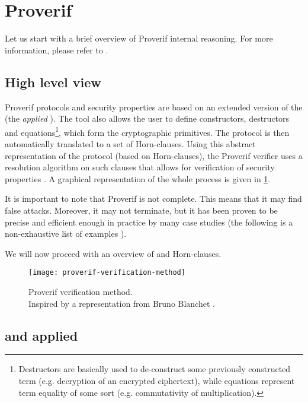 \section{Proverif}
Let us start with a brief overview of Proverif internal reasoning. For more information, please refer to \cite{SymbolicComputationalBlanchet, SymbolicVerificationBlanchet, ProverifManual}.

\subsection{High level view}
Proverif protocols and security properties are based on an extended version of the \pic (the \textit{applied} \pic). The tool also allows the user to define constructors, destructors and equations\footnote{Destructors are basically used to de-construct some previously constructed term (e.g. decryption of an encrypted ciphertext), while equations represent term equality of some sort (e.g. commutativity of multiplication).}, which form the cryptographic primitives. The protocol is then automatically translated to a set of Horn-clauses. Using this abstract representation of the protocol (based on Horn-clauses), the Proverif verifier uses a resolution algorithm on such clauses that allows for verification of security properties \cite{SymbolicComputationalBlanchet}.
A graphical representation of the whole process is given in \cref{fig:proverif-verification-method}.

It is important to note that Proverif is not complete. This means that it may find false attacks. Moreover, it may not terminate, but it has been proven to be precise and efficient enough in practice by many case studies (the following is a non-exhaustive list of examples \cite{10.1145/1266977.1266978, ABADI20053, hal-01575923, DBLP:journals/corr/abs-2012-03141}).

We will now proceed with an overview of \pic and Horn-clauses.

\begin{figure}[t]
    \texttt{[image: proverif-verification-method]}
    \centering
    \caption{Proverif verification method.\\Inspired by a representation from Bruno Blanchet \cite{SymbolicComputationalBlanchet}.}
    \label{fig:proverif-verification-method}
\end{figure}

\subsection{\pic and applied \pic}


